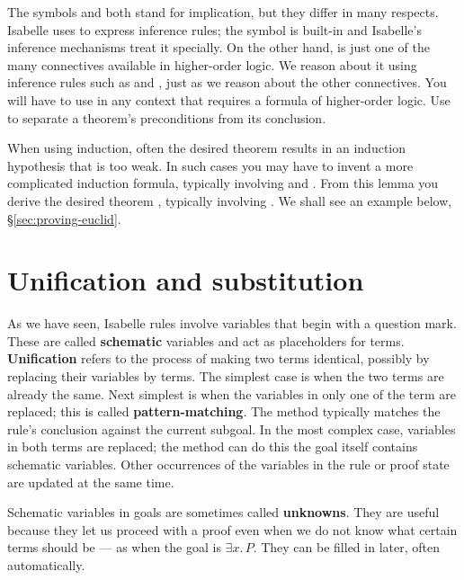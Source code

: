 The symbols \isa{\isasymLongrightarrow} and \isa{\isasymlongrightarrow}
both stand for implication, but they differ in many respects.  Isabelle
uses \isa{\isasymLongrightarrow} to express inference rules; the symbol is
built-in and Isabelle's inference mechanisms treat it specially.  On the
other hand, \isa{\isasymlongrightarrow} is just one of the many connectives
available in higher-order logic.  We reason about it using inference rules
such as  and , just as we reason about the other
connectives.  You will have to use \isa{\isasymlongrightarrow} in any
context that requires a formula of higher-order logic.  Use
\isa{\isasymLongrightarrow} to separate a theorem's preconditions from its
conclusion.  

When using induction, often the desired theorem results in an induction
hypothesis that is too weak.  In such cases you may have to invent a more
complicated induction formula, typically involving
\isa{\isasymlongrightarrow} and \isa{\isasymforall}.  From this lemma you
derive the desired theorem , typically involving
\isa{\isasymLongrightarrow}.  We shall see an example below,
\S\ref{sec:proving-euclid}.


\section{Unification and substitution}\label{sec:unification}

As we have seen, Isabelle rules involve variables that begin  with a
question mark. These are called \textbf{schematic} variables  and act as
placeholders for terms. \textbf{Unification} refers to  the process of
making two terms identical, possibly by replacing  their variables by
terms. The simplest case is when the two terms  are already the same. Next
simplest is when the variables in only one of the term
 are replaced; this is called \textbf{pattern-matching}.  The
{} method typically  matches the rule's conclusion
against the current subgoal.  In the most complex case,  variables in both
terms are replaced; the {} method can do this the goal
itself contains schematic variables.  Other occurrences of the variables in
the rule or proof state are updated at the same time.

Schematic variables in goals are sometimes called \textbf{unknowns}.  They
are useful because they let us proceed with a proof even  when we do not
know what certain terms should be --- as when the goal is $\exists x.\,P$. 
They can be  filled in later, often automatically. 

